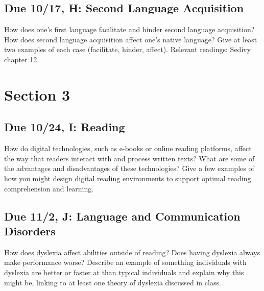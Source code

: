 \documentclass[
  letterpaper,
  DIV=11,
  numbers=noendperiod]{scrreprt}
\begin{document}
\hypertarget{due-1017-h-second-language-acquisition}{%
\subsection*{Due 10/17, H: Second Language
Acquisition}\label{due-1017-h-second-language-acquisition}}

How does one's first language facilitate and hinder second language
acquisition? How does second language acquisition affect one's native
language? Give at least two examples of each case (facilitate, hinder,
affect). Relevant readings: Sedivy chapter 12.

\hypertarget{section-3}{%
\section*{\texorpdfstring{{Section 3}}{Section 3}}\label{section-3}}


\hypertarget{due-1024-i-reading}{%
\subsection*{Due 10/24, I: Reading}\label{due-1024-i-reading}}

How do digital technologies, such as e-books or online reading
platforms, affect the way that readers interact with and process written
texts? What are some of the advantages and disadvantages of these
technologies? Give a few examples of how you might design digital
reading environments to support optimal reading comprehension and
learning.

\hypertarget{due-112-j-language-and-communication-disorders}{%
\subsection*{Due 11/2, J: Language and Communication
Disorders}\label{due-112-j-language-and-communication-disorders}}

How does dyslexia affect abilities outside of reading? Does having
dyslexia always make performance worse? Describe an example of something
individuals with dyslexia are better or faster at than typical
individuals and explain why this might be, linking to at least one
theory of dyslexia discussed in class.
\end{document}
